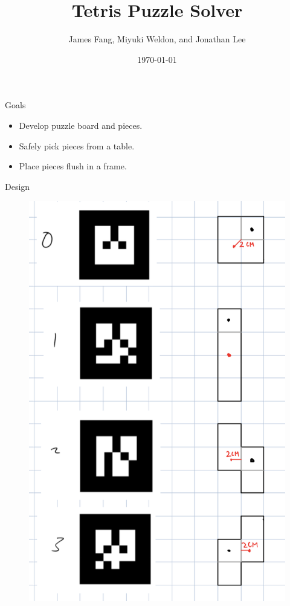 \documentclass{beamer}
\title{Tetris Puzzle Solver}
\date{\today}
\author{James Fang, Miyuki Weldon, and Jonathan Lee}
\institute{EECS 106A at UC Berkeley}
\begin{document}
  \maketitle
  \begin{frame}{Goals}
    \begin{itemize}
      \item Develop puzzle board and pieces.
      \item Safely pick pieces from a table.
      \item Place pieces flush in a frame.
    \end{itemize}
  \end{frame}
  \begin{frame}{Design}
    \begin{figure}
      \includegraphics[height=0.85\textheight]{tiles-1}

\end{figure}
\end{frame}
\end{document}
